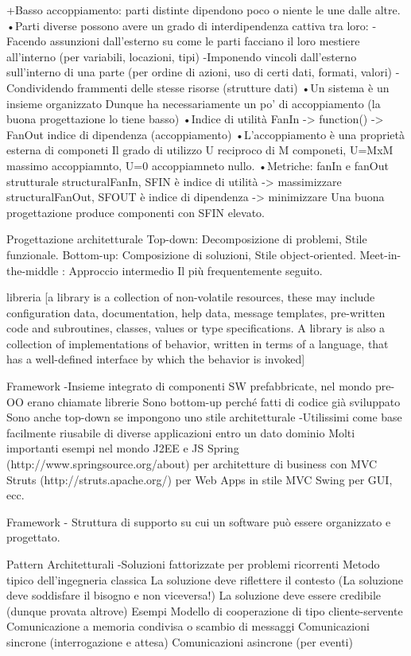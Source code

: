 \documentclass{report}
\begin{document}
+Basso accoppiamento: parti distinte dipendono poco o niente le une dalle altre. 
•Parti diverse possono avere un grado di interdipendenza cattiva tra loro: 
-Facendo assunzioni dall’esterno su come le parti facciano il loro mestiere all’interno (per variabili, locazioni, tipi)
-Imponendo vincoli dall’esterno sull’interno di una parte (per ordine di azioni, uso di certi dati, formati, valori)
-Condividendo frammenti delle stesse risorse (strutture dati)
•Un sistema è un insieme organizzato Dunque ha necessariamente un po’ di accoppiamento (la buona progettazione lo tiene basso)
•Indice di utilità FanIn -> function() -> FanOut  indice di dipendenza (accoppiamento)
•L'accoppiamento è una proprietà esterna di componeti
Il grado di utilizzo U reciproco di M componeti, U=MxM massimo accoppiamnto, U=0 accoppiamneto nullo.
•Metriche: fanIn e fanOut strutturale  
structuralFanIn, SFIN è indice di utilità -> massimizzare 
structuralFanOut, SFOUT è indice di dipendenza -> minimizzare
Una buona progettazione produce componenti con SFIN elevato.


Progettazione architetturale
Top-down: Decomposizione di problemi, Stile funzionale.
Bottom-up: Composizione di soluzioni, Stile object-oriented.
Meet-in-the-middle : Approccio intermedio Il più frequentemente seguito.

libreria [a library is a collection of non-volatile resources, these may include configuration data, documentation, help data, message templates, pre-written code and subroutines, classes, values or type specifications. A library is also a collection of implementations of behavior, written in terms of a language, that has a well-defined interface by which the behavior is invoked]

Framework
-Insieme integrato di componenti SW prefabbricate, nel mondo pre-OO erano chiamate librerie
Sono bottom-up perché fatti di codice già sviluppato
Sono anche top-down se impongono uno stile architetturale
-Utilissimi come base facilmente riusabile di diverse applicazioni entro un dato dominio
Molti importanti esempi nel mondo J2EE e JS
Spring (http://www.springsource.org/about) per architetture di business con MVC
Struts (http://struts.apache.org/) per Web Apps in stile MVC
Swing per GUI, ecc.

Framework - Struttura di supporto su cui un software può essere organizzato e progettato.

Pattern Architetturali
-Soluzioni fattorizzate per problemi ricorrenti
Metodo tipico dell’ingegneria classica
La soluzione deve riflettere il contesto (La soluzione deve soddisfare il bisogno e non viceversa!)
La soluzione deve essere credibile (dunque provata altrove)
Esempi
 Modello di cooperazione di tipo cliente-servente
 Comunicazione a memoria condivisa o scambio di messaggi
 Comunicazioni sincrone (interrogazione e attesa)
 Comunicazioni asincrone (per eventi)
\end{document}
